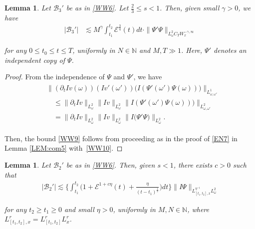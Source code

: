 \documentclass[letterpaper, 11pt,  reqno]{amsart}
\newtheorem{lemma}[theorem]{Lemma}
\newcommand{\1}{\hspace{0.5mm}\text{I}\hspace{0.2mm}}
\newcommand{\noi}{\noindent}
\newcommand{\N}{\mathbb{N}}
\newcommand{\om}{\omega}
\newcommand{\dt}{\partial_t}
\newcommand{\les}{\lesssim}
\newcommand{\g}{\gamma}
\newcommand{\EE}{\mathcal{E}}
\newcommand{\B}{\mathcal{B}}
\renewcommand{\o}{\omega}
\numberwithin{equation}{section}
\numberwithin{theorem}{section}
\begin{document}
\begin{lemma}
\label{LEM:CM3}
Let  $\B_3'$ be as in \eqref{WW6}.
Let $\frac 23 \le s < 1$.
 Then, given small $\g > 0$, we have 
\begin{align} 
| \B_3' | & \les M^{\g} \int_{t_1}^{t_2} \EE^{\frac 34}(t) d t
\cdot 
\| \Psi' \Psi  \|_{L_\om^2 C_T W_x^{- \g, \infty}} 
\label{WW9}
\end{align} 



\noi
for any 
$0 \le t_0 \le t \le T$, 
uniformly in 
$N \in \N$ and  $M, T \gg 1$.
Here, $\Psi'$ denotes an independent copy of $\Psi$.




\end{lemma}











\begin{proof} 

From the independence of $\Psi$ and $\Psi'$, we have 
\begin{align} 
\begin{split}
& \big\| (\dt I v(\o))
 (I v'(\o')) \big(I  (\Psi' (\o') \Psi(\o)) \big)\big\|_{L^1_{\o, \o'}} \\
& \quad 
\le  
\|\dt I v\|_{L^2_\o}
\|  I v\|_{L^2_\o}
 \big\| I  (\Psi' (\o') \Psi(\o)) \big)\big\|_{L^2_{\o, \o'}} \\
& \quad 
= \|\dt I v\|_{L^2_\o}
 \| I v\|_{L^2_\o}
 \big\| I  (\Psi' \Psi \big)\big\|_{L^2_{\o}}. 
\end{split}
\label{WW10}
\end{align}  


\noi
Then, the bound \eqref{WW9}
follows
from proceeding as in the proof of \eqref{EN7}
in Lemma \ref{LEM:com5}
with~\eqref{WW10}.
\end{proof}



\begin{lemma}
\label{LEM:CM4}
Let $\B_2'$ be as in \eqref{WW6}.
Then, given $s < 1$, 
there exists $c > 0$ such that 
\begin{align} 
| \B_2' | \les 
\bigg\{\int_{t_1}^{t_2} 
\Big(1 + 
 \EE^{1 + c\eta} (t)+ \frac {\eta}{(t - t_1)^{\frac 12}} \Big)  d t\bigg\}
\| I \Psi \|_{ L^{\eta^{-1}}_{[t_1, t_2], x} L^2_\o } 
\label{WW11}
\end{align} 

\noi 
for any 
$t_2 \geq t_1 \geq 0$
and small $\eta > 0$,  
uniformly in 
$M, N \in \N$, 
where
$L^r_{[t_1, t_2], x}
= L^r_{[t_1, t_2]}L^r_x$.


\end{lemma}
\end{document}
